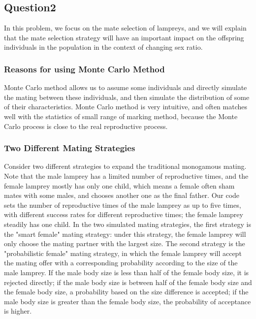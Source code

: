 \documentclass[12pt]{article}
\begin{document}
\subsection{Question2}

In this problem, we focus on the mate selection of lampreys, and we will explain that the mate
selection strategy will have an important impact on the offspring individuals in the
population in the context of changing sex ratio.

\subsubsection{Reasons for using Monte Carlo Method}

Monte Carlo method allows us to assume some individuals and directly simulate the mating between
these individuals, and then simulate the distribution of some of their characteristics.
Monte Carlo method is very intuitive, and often matches well with the statistics of small
range of marking method, because the Monte Carlo process is close to the real reproductive process.

\subsubsection{Two Different Mating Strategies}

Consider two different strategies to expand the traditional monogamous mating. Note that the
male lamprey has a limited number of reproductive times, and the female lamprey mostly has
only one child, which means a female often sham mates with some males, and chooses another
one as the final father. Our code sets the number of reproductive times of the male lamprey
as up to five times, with different success rates for different reproductive times; the female
lamprey steadily has one child. In the two simulated mating strategies, the first strategy is
the "smart female" mating strategy: under this strategy, the female lamprey will only choose
the mating partner with the largest size. The second strategy is the "probabilistic female"
mating strategy, in which the female lamprey will accept the mating offer with a corresponding
probability according to the size of the male lamprey. If the male body size is less than
half of the female body size, it is rejected directly; if the male body size is between half
of the female body size and the female body size, a probability based on the size difference
is accepted; if the male body size is greater than the female body size, the probability of acceptance is higher.
\end{document}

